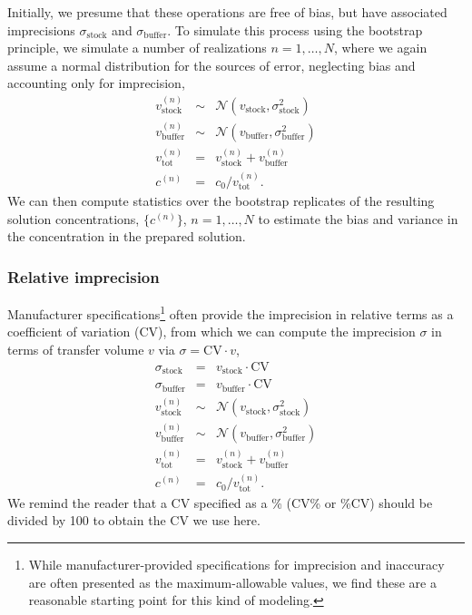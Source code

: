 \documentclass[aps,pre,twocolumn,nofootinbib,superscriptaddress,linenumbers]{revtex4-1}
\begin{document}
Initially, we presume that these operations are free of bias, but have associated imprecisions $\sigma_\mathrm{stock}$ and $\sigma_\mathrm{buffer}$. 
To simulate this process using the bootstrap principle, we simulate a number of realizations $n = 1, \ldots, N$, where we again assume a normal distribution for the sources of error, neglecting bias and accounting only for imprecision,
\begin{eqnarray}
v_\mathrm{stock}^{(n)} &\sim& \mathcal{N}(v_\mathrm{stock}, \sigma_\mathrm{stock}^2) \nonumber \\
v_\mathrm{buffer}^{(n)} &\sim& \mathcal{N}(v_\mathrm{buffer}, \sigma_\mathrm{buffer}^2) \nonumber \\
v_\mathrm{tot}^{(n)} &=& v_\mathrm{stock}^{(n)} + v_\mathrm{buffer}^{(n)} \nonumber \\
c^{(n)} &=& c_0 / v_\mathrm{tot}^{(n)} .
\end{eqnarray}
We can then compute statistics over the bootstrap replicates of the resulting solution concentrations, $\{c^{(n)}\}$, $n = 1,\ldots,N$ to estimate the bias and variance in the concentration in the prepared solution.

\subsubsection*{Relative imprecision}

Manufacturer specifications\footnote{While manufacturer-provided specifications for imprecision and inaccuracy are often presented as the maximum-allowable values, we find these are a reasonable starting point for this kind of modeling.} often provide the imprecision in relative terms as a coefficient of variation (CV), from which we can compute the imprecision $\sigma$ in terms of transfer volume $v$ via $\sigma = \mathrm{CV} \cdot v$,
\begin{eqnarray}
\sigma_\mathrm{stock} &=& v_\mathrm{stock} \cdot \mathrm{CV} \nonumber \\
\sigma_\mathrm{buffer} &=& v_\mathrm{buffer} \cdot \mathrm{CV} \nonumber \\
v_\mathrm{stock}^{(n)} &\sim& \mathcal{N}(v_\mathrm{stock} , \sigma_\mathrm{stock}^2) \nonumber \\
v_\mathrm{buffer}^{(n)} &\sim& \mathcal{N}(v_\mathrm{buffer}, \sigma_\mathrm{buffer}^2) \nonumber \\
v_\mathrm{tot}^{(n)} &=& v_\mathrm{stock}^{(n)} + v_\mathrm{buffer}^{(n)} \nonumber \\
c^{(n)} &=& c_0 / v_\mathrm{tot}^{(n)} .
\end{eqnarray}
We remind the reader that a CV specified as a \% (CV\% or \%CV) should be divided by 100 to obtain the CV we use here.
\end{document}
